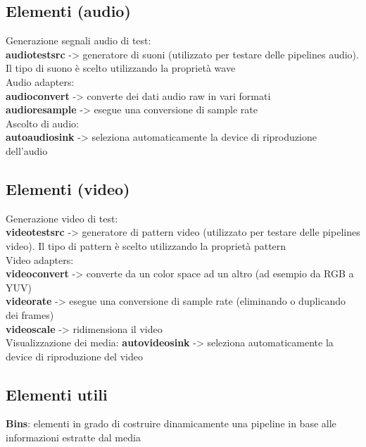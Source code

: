 \documentclass[8pt,a4paper]{article}
\begin{document}
\begin{multicols}{5}
    \subsection{Elementi (audio)}
    Generazione segnali audio di test:\\
    \textbf{audiotestsrc} -> generatore di suoni (utilizzato per testare delle pipelines audio).
    Il tipo di suono è scelto utilizzando la proprietà wave\\
    
    Audio adapters:\\
    \textbf{audioconvert} -> converte dei dati audio raw in vari formati\\
    \textbf{audioresample} -> esegue una conversione di sample rate\\
    Ascolto di audio:\\
    \textbf{autoaudiosink} -> seleziona automaticamente la device di riproduzione dell’audio

    \subsection{Elementi (video)}
    Generazione video di test:\\
    \textbf{videotestsrc} -> generatore di pattern video (utilizzato per testare delle pipelines
    video). Il tipo di pattern è scelto utilizzando la proprietà pattern\\
    
    Video adapters:\\
    \textbf{videoconvert} -> converte da un color space ad un altro (ad esempio da RGB a YUV)\\
    \textbf{videorate} -> esegue una conversione di sample rate (eliminando o duplicando dei frames)\\
    \textbf{videoscale} -> ridimensiona il video\\

    Visualizzazione dei media:
    \textbf{autovideosink} -> seleziona automaticamente la device di riproduzione del video

    \subsection{Elementi utili}

    \textbf{Bins}: elementi in grado di costruire dinamicamente una pipeline in base alle informazioni estratte dal media\\
    

\end{multicols}
\end{document}

